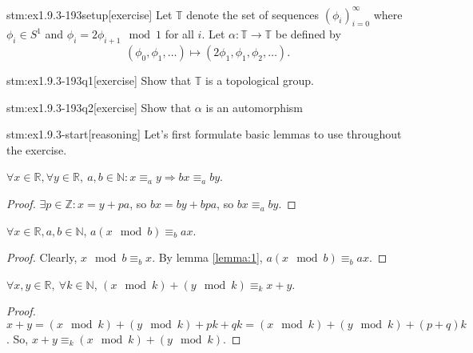 
\begin{stm}{stm:ex1.9.3-193setup}[exercise]
Let $\mathbb{T}$ denote the set of sequences $(\phi_i)_{i=0}^{\infty}$ where $\phi_i \in S^1$ and $\phi_i = 2 \phi_{i+1} \mod 1$ for all $i$. Let $\alpha : \mathbb{T} \to \mathbb{T}$ be defined by 
\[
(\phi_0, \phi_1, \dots) \mapsto (2\phi_1, \phi_1, \phi_2, \dots).
\]
\end{stm}
\begin{stm}{stm:ex1.9.3-193q1}[exercise]
Show that $\mathbb{T}$ is a topological group.
\end{stm}

\begin{stm}{stm:ex1.9.3-193q2}[exercise]
Show that $\alpha$ is an automorphism
\end{stm}
    


\begin{stm}{stm:ex1.9.3-start}[reasoning]
Let's first formulate basic lemmas to use throughout the exercise.
\end{stm}

\begin{lemma}\label{lemma:1}
$\forall x \in \mathbb{R}, \forall y \in \mathbb{R}, \ a, b \in \mathbb{N} : x \equiv_a y \Rightarrow bx \equiv_{a} by$. 
\end{lemma}

\begin{proof}
$\exists p \in \mathbb{Z} : x = y + pa$, so $bx = by + bpa$, so $bx \equiv_{a} by$.
\end{proof}

\begin{lemma}\label{lemma:3}
$\forall x \in \mathbb{R}, a,b \in \mathbb{N}$, $a(x \mod b) \equiv_b ax$.
\end{lemma}

\begin{proof}
Clearly, $x \mod b \equiv_b x$. By lemma \ref{lemma:1}, $a(x \mod b) \equiv_b ax$.
\end{proof}

\begin{lemma}\label{lemma:4}
$\forall x, y \in \mathbb{R}, \ \forall k \in \mathbb{N}$, $( x \mod k ) + ( y \mod k ) \equiv_k x + y$.
\end{lemma}

\begin{proof}
$x + y = ( x \mod k ) + ( y \mod k ) + pk + qk = (x \mod k) + (y \mod k) + (p+q)k$. So, $x + y \equiv_k (x \mod k) + (y \mod k)$.
\end{proof}

